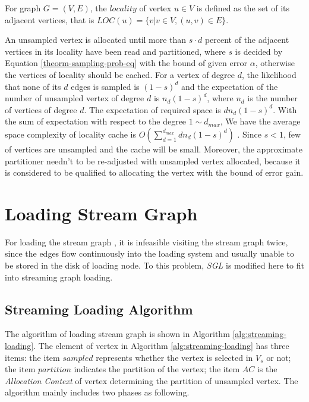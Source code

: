 \documentclass{sig-alternate-2013}
\begin{document}
\begin{definition}\label{def-locality}
For graph $G=(V, E)$, the $locality$ of vertex $u\in V$ is defined as the set of its adjacent  vertices, that is $LOC(u)=\{v | v\in V, (u,v)\in E \}$.
\end{definition}

An unsampled vertex is allocated until more than $s \cdot d$ percent of the adjacent vertices in its locality have been read and partitioned, where $s$ is decided by Equation \ref{theorm-sampling-prob-eq} with the bound of given error $\alpha$, otherwise  the vertices of locality should be cached.
For a vertex of degree $d$, the likelihood that none of its $d$ edges is sampled is  $(1-s)^d$ and the expectation of the number of unsampled vertex of degree $d$ is $n_d (1-s)^d$, where $n_d$ is the number of vertices of degree $d$. The expectation of required space is $d n_d (1-s)^d$.
With the sum of expectation with respect to the degree $1\sim d_{max}$, We have the average space complexity of locality cache is $O(\sum_{d=1}^{d_{max}} {d n_d(1-s)^d})$ .
Since $s<1$, few of vertices are unsampled and the cache will be small.
Moreover,  the approximate partitioner needn't to be re-adjusted with unsampled vertex allocated, because it is considered to be qualified to allocating the vertex with the bound of error gain.

\section{ Loading Stream Graph }
For loading the stream graph , it is infeasible visiting the stream graph twice, since the edges flow continuously into the loading system and usually unable to be stored in the disk of loading node. To this problem, \textit{SGL} is modified here to fit into streaming graph loading.

\subsection {Streaming Loading Algorithm}

The algorithm of loading stream graph is shown in Algorithm \ref{alg:streaming-loading}.
The element of vertex in Algorithm \ref{alg:streaming-loading} has three items:
the item $sampled$ represents whether the vertex is selected in $V_s$ or not;
the item $partition$ indicates the partition of the vertex;
the item $AC$ is the \textit{Allocation Context} of vertex determining the partition of unsampled vertex.
The algorithm mainly includes two phases as following.
\end{document}
